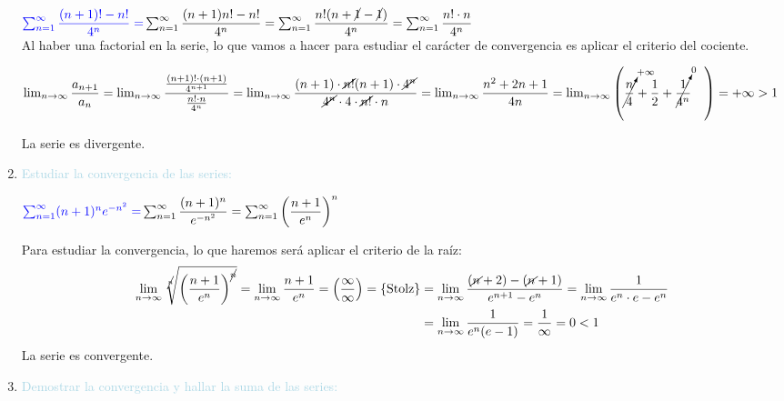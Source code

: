 \documentclass[12pt]{article}
\newcommand{\lb}[1]{\textcolor{lightblue}{#1}}
\newcommand{\db}[1]{\textcolor{blue}{#1}}
\newcommand{\tozero}[1]{\cancelto{0}{#1}~~~}
\begin{document}
\begin{enumerate}[label=\color{red}\textbf{\arabic*}),leftmargin=*, start=27]
\begin{minipage}[l]{0.6\linewidth}
      $\db{\sum_{n=1}^{\infty}\dfrac{(n+1)!-n!}{4^n}=}\sum_{n=1}^{\infty}\dfrac{(n+1)n!-n!}{4^n}=\sum_{n=1}^{\infty}\dfrac{n!(n+\cancel{1}-\cancel{1})}{4^n}=\sum_{n=1}^{\infty}\dfrac{n!\cdot n}{4^n}$\\
      Al haber una factorial en la serie, lo que vamos a hacer para estudiar el carácter de convergencia es aplicar el criterio del cociente.  \begin{center}
            $\lim_{n\to\infty}\dfrac{a_{n+1}}{a_n}=\lim_{n\to\infty}\dfrac{\frac{(n+1)!\cdot(n+1)}{4^{n+1}}}{\frac{n!\cdot n}{4^n}}=\lim_{n\to\infty}\dfrac{(n+1)\cdot\cancel{n!}(n+1)\cdot\cancel{4^n}}{\cancel{4^n}\cdot4\cdot\cancel{n!}\cdot n}=\lim_{n\to\infty}\dfrac{n^2+2n+1}{4n}=\lim_{n\to\infty}\left(\cancelto{+\infty}{\dfrac{n}{4}}+\dfrac{1}{2}+\tozero{\dfrac{1}{4^n}}\right)=+\infty>1\quad$ 
      \end{center}La serie es divergente.
\end{minipage}\qquad
\begin{minipage}[l]{0.4\linewidth}
\end{minipage}
\item \lb{Estudiar la convergencia de las series:}

$\db{\sum_{n=1}^{\infty}(n+1)^ne^{-n^2}=}\sum_{n=1}^{\infty}\dfrac{(n+1)^n}{e^{-n^2}}=\sum_{n=1}^{\infty}\left(\dfrac{n+1}{e^n}\right)^n$

Para estudiar la convergencia, lo que haremos será aplicar el criterio de la raíz: \[ \begin{aligned}
      \lim_{n\to\infty}\sqrt[\cancel{n}]{\left(\dfrac{n+1}{e^n}\right)^{\cancel{n}}}=\lim_{n\to\infty}\dfrac{n+1}{e^n}=\left(\dfrac{\infty}{\infty}\right)=\{\mathrm{Stolz}\}&=\lim_{n\to\infty}\dfrac{(\cancel{n}+2)-(\cancel{n}+1)}{e^{n+1}-e^n}=\lim_{n\to\infty}\dfrac{1}{e^n\cdot e-e^n}\\
      &=\lim_{n\to\infty}\dfrac{1}{e^n(e-1)}=\dfrac{1}{\infty}=0<1
\end{aligned} \] La serie es convergente.
\item \lb{Demostrar la convergencia y hallar la suma de las series:}


\end{enumerate}
\end{document}
